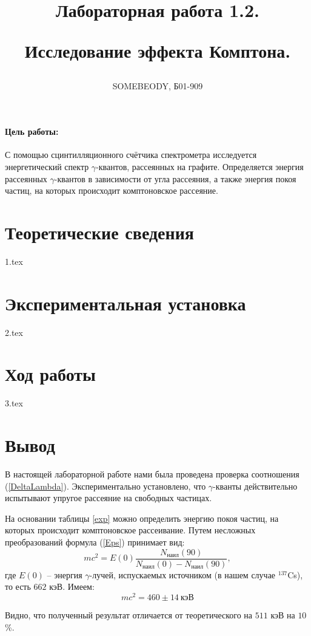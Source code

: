 \documentclass[a5paper, 10pt, twoside]{article} %
\title
{\hfill \break  \hfill \break
\hfill \break  \hfill \break
Лабораторная работа 1.2.

Исследование эффекта Комптона.}
\author{SOMEBEODY, Б01-909}
\begin{document}
\maketitle



\thispagestyle{empty} %

\newpage

\tableofcontents %
\thispagestyle{plain}
\newpage


\paragraph{Цель работы:}
С помощью сцинтилляционного счётчика спектрометра исследуется энергетический
спектр $\gamma$-квантов, рассеянных на графите. Определяется энергия рассеянных
$\gamma$-квантов в зависимости от угла рассеяния, а также энергия покоя частиц,
на которых происходит комптоновское рассеяние.

\section{Теоретические сведения}
{1.tex}

\newpage
\section{Экспериментальная установка}
{2.tex}

\newpage
\section{Ход работы}
{3.tex}

\newpage
\section{Вывод}

В настоящей лабораторной работе нами была проведена проверка соотношения
(\ref{DeltaLambda}). Экспериментально установлено, что $\gamma$-кванты
действительно испытывают упругое рассеяние на свободных частицах.

На основании таблицы \ref{exp} можно определить энергию покоя частиц, на которых
происходит комптоновское рассеивание. Путем несложных преобразований формула
(\ref{Eps}) принимает вид:
$$
  mc^2 = E(0) \frac{N_\text{наил}(90)}{N_\text{наил}(0)-N_\text{наил}(90)},
$$
где $E(0)$ -- энергия $\gamma$-лучей, испускаемых источником (в нашем случае
$^{137}$Cs), то есть $662$ кэВ. Имеем:
\[
  \boxed{mc^2 = 460 \pm 14 \ \text{кэВ}}
\]

Видно, что полученный результат отличается от теоретического на $511$ кэВ на
$10$\%.
\end{document}
